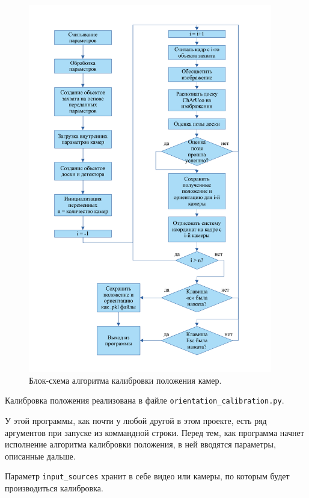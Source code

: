 \documentclass[12pt, a4paper]{article}
\begin{document}
\begin{figure}[h!]
  \begin{center}
    \includegraphics[width=0.95\textwidth]{images/block-schemes/orientation_scheme.png}
  \end{center}
  \caption{Блок-схема алгоритма калибровки положения камер.}\label{fig:orientation_calibration_scheme}
\end{figure}

Калибровка положения реализована в файле \texttt{orientation\_calibration.py}.

У этой программы, как почти у любой другой в этом проекте, есть ряд аргументов
при запуске из коммандной строки. Перед тем, как программа начнет исполнение
алгоритма калибровки положения, в ней вводятся параметры, описанные дальше.

Параметр \texttt{input\_sources} хранит в себе видео или камеры, по которым
будет производиться калибровка.
\end{document}
